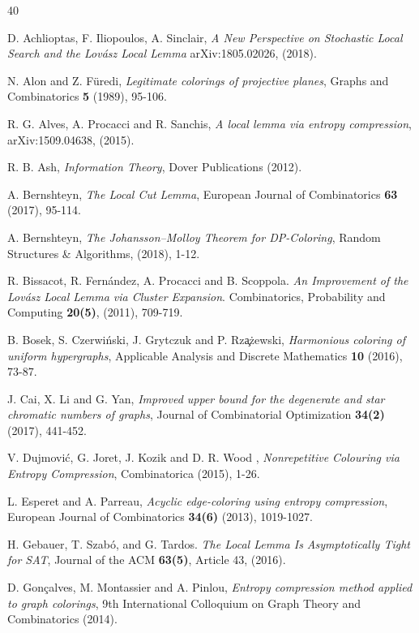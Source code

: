 \documentclass[11pt]{amsart}
\numberwithin{equation}{section}
\begin{document}
\begin{thebibliography}{40}

 D. Achlioptas, F. Iliopoulos, A. Sinclair, \textit{A New Perspective on Stochastic Local Search and the Lov\'asz Local Lemma} arXiv:1805.02026, (2018).

 N. Alon and Z. F\"uredi, \textit{Legitimate colorings of projective planes}, Graphs and Combinatorics \textbf{5} (1989), 95-106.
	
 R. G. Alves, A. Procacci and R. Sanchis, \textit{A local lemma via entropy compression}, arXiv:1509.04638, (2015).

 R. B. Ash, \textit{Information Theory}, Dover Publications (2012).

 A. Bernshteyn, \textit{The Local Cut Lemma}, European Journal of Combinatorics \textbf{63} (2017), 95-114.

 A. Bernshteyn, \textit{The Johansson--Molloy Theorem for DP-Coloring},  Random Structures \& Algorithms, (2018), 1-12.

  R. Bissacot, R. Fern\'{a}ndez, A. Procacci and B. Scoppola. \textit{An Improvement of the Lovász Local Lemma via Cluster Expansion}. Combinatorics, Probability and Computing \textbf{20(5)}, (2011), 709-719. 

 B. Bosek, S. Czerwi\'nski, J. Grytczuk and P. Rz\c{a}\.zewski, \textit{Harmonious coloring of uniform hypergraphs}, Applicable Analysis and Discrete Mathematics \textbf{10} (2016), 73-87.

 J. Cai, X.  Li and G. Yan, \textit{Improved upper bound for the degenerate and star chromatic numbers of graphs}, Journal of Combinatorial Optimization \textbf{34(2)} (2017), 441-452.

 V. Dujmovi\'{c}, G. Joret, J. Kozik and D. R. Wood , \textit{Nonrepetitive Colouring via Entropy Compression}, Combinatorica (2015), 1-26.

 L. Esperet and A. Parreau,  \textit{Acyclic edge-coloring using entropy compression}, European Journal of Combinatorics \textbf{34(6)} (2013), 1019-1027.

 H. Gebauer, T. Szabó, and G. Tardos. \textit{The Local Lemma Is Asymptotically Tight for SAT}, Journal of the ACM \textbf{63(5)}, Article 43, (2016).

 D. Gon\c{c}alves, M. Montassier and A. Pinlou, \textit{Entropy compression method applied to graph colorings}, 9th International Colloquium on Graph Theory and Combinatorics (2014). 


\end{thebibliography}
\end{document}
